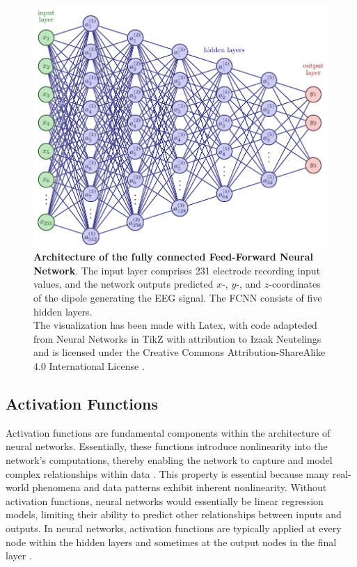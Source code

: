 \documentclass[a4paper, UKenglish, 11pt]{uiomaster}
\begin{document}
\begin{figure}[!htb]
    \centering
    \includegraphics[width=\linewidth]{figures/FFNN_architecture.pdf}
    \caption{\textbf{Architecture of the fully connected Feed-Forward Neural Network}. The input layer comprises 231 electrode recording input values, and the network outputs predicted $x$-, $y$-, and $z$-coordinates of the dipole generating the EEG signal. The FCNN consists of five hidden layers. \\
    The visualization has been made with Latex, with code adapteded from Neural Networks in TikZ with attribution to Izaak Neutelings and is licensed under the Creative Commons Attribution-ShareAlike 4.0 International License \cite{neutelings2021}.}
    \label{fig:FFNN_architecture}
\end{figure}



\subsection{Activation Functions}

Activation functions are fundamental components within the architecture of neural networks. Essentially, these functions introduce nonlinearity into the network's computations, thereby enabling the network to capture and model complex relationships within data \cite{sharma2017activation}. This property is essential because many real-world phenomena and data patterns exhibit inherent nonlinearity. Without activation functions, neural networks would essentially be linear regression models, limiting their ability to predict other relationships between inputs and outputs. In neural networks, activation functions are typically applied at every node within the hidden layers and sometimes at the output nodes in the final layer \cite{choose_activation_function}.
\end{document}
